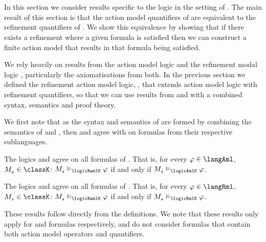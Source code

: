 \section{\classK{}}\label{aaml-k}

In this section we consider results specific to the logic \logicAamlK{} in the setting of \classK{}.
The main result of this section is that the action model quantifiers of \logicAamlK{} are equivalent to the refinement quantifiers of \logicRmlK{}.
We show this equivalence by showing that if there exists a refinement where a given formula is satisfied then we can construct a finite action model that results in that formula being satisfied.

We rely heavily on results from the action model logic \logicAmlK{} and the refinement modal logic \logicRmlK{}, particularly the axiomatisations from both.
In the previous section we defined the refinement action model logic, \logicRamlK{}, that extends action model logic with refinement quantifiers, so that we can use results from \logicAmlK{} and \logicRmlK{} with a combined syntax, semantics and proof theory.

We first note that as the syntax and semantics of \logicRamlK{} are formed by combining the semantics of \logicAmlK{} and \logicRmlK{}, then \logicAmlK{} and \logicRmlK{} agree with \logicRamlK{} on formulas from their respective sublanguages.

\begin{lemma}\label{raml-k-aml}
The logics \logicRamlK{} and \logicAmlK{} agree on all formulas of \langAml{}.
That is, for every $\phi \in \langAml$, $\kPModel{\kStateS} \in \classK$: $\kPModel{\kStateS} \entails_\logicRamlK \phi$ if and only if $\kPModel{\kStateS} \entails_\logicAmlK \phi$.
\end{lemma}

\begin{lemma}\label{raml-k-rml}
The logics \logicRamlK{} and \logicRmlK{} agree on all formulas of \langRml{}.
That is, for every $\phi \in \langRml$, $\kPModel{\kStateS} \in \classK$: $\kPModel{\kStateS} \entails_\logicRamlK \phi$ if and only if $\kPModel{\kStateS} \entails_\logicRmlK \phi$.
\end{lemma}

These results follow directly from the definitions.
We note that these results only apply for \langAml{} and \langRml{} formulas respectively, and do not consider \langAaml{} formulas that contain both action model operators and quantifiers. 


